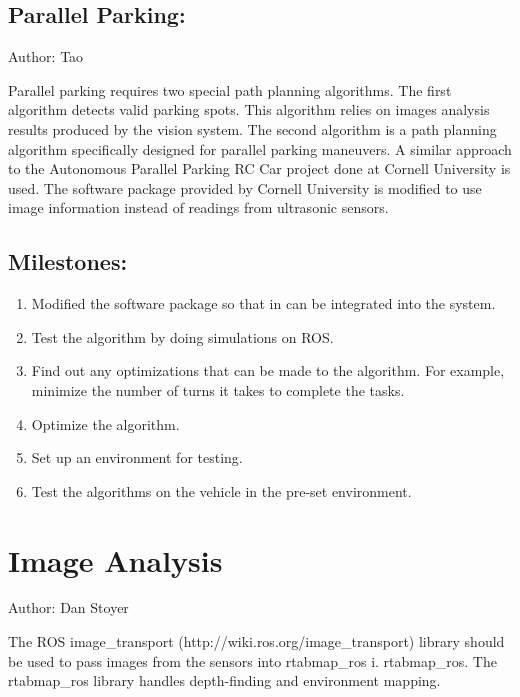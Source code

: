 \documentclass[compsoc,draftclsnofoot,onecolumn,10pt]{IEEEtran}
\begin{document}
\subsection{Parallel Parking:}
Author: Tao \par
Parallel parking requires two special path planning algorithms. The first algorithm detects valid parking spots. This algorithm relies on images analysis results produced by the vision system. The second algorithm is a path planning algorithm specifically designed for parallel parking maneuvers. A similar approach to the Autonomous Parallel Parking RC Car project done at Cornell University is used. The software package provided by Cornell University is modified to use image information instead of readings from ultrasonic sensors.\par
\subsection{Milestones:}
\begin{enumerate}
	\item Modified the software package so that in can be integrated into the system.
	\item Test the algorithm by doing simulations on ROS.
	\item Find out any optimizations that can be made to the algorithm. For example, minimize the number of turns it takes to complete the tasks.
	\item Optimize the algorithm.
	\item Set up an environment for testing.
	\item Test the algorithms on the vehicle in the pre-set environment.
\end{enumerate}

\section{Image Analysis}
Author: Dan Stoyer\par
The ROS image\_transport (http://wiki.ros.org/image\_transport) library should
be used to pass images from the sensors into rtabmap\_ros i. rtabmap\_ros. The
rtabmap\_ros library handles depth-finding and environment mapping. 
\end{document}
